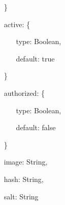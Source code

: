 \documentclass{article}
\begin{document}
\begin{itemize}
	\item[\}]
	\item[active: \{]
	\begin{itemize}
		\item[]
		\item[]type: Boolean,
		\item[]default: true
	\end{itemize}
	\item[\}]
	\item[authorized: \{]
	\begin{itemize}
		\item[]
		\item[]type: Boolean,
		\item[]default: false
	\end{itemize}
	\item[\}]
	\item[]image: String,
  	\item[]hash: String,
  	\item[]salt: String
\end{itemize}
\end{document}
